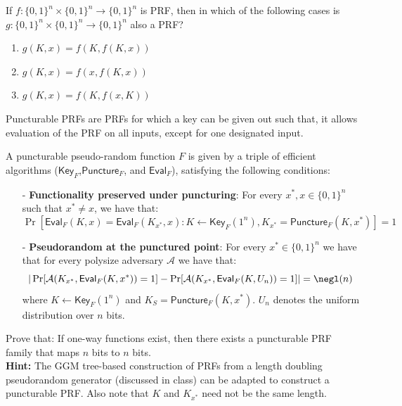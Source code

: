 \documentclass[12pt]{tufte-book}
\begin{document}
\begin{exercise}
    If $f: \{0,1\}^{n}\times \{0,1\}^n\rightarrow \{0,1\}^n$  is PRF, then in which of the following cases is $g: \{0,1\}^{n}\times \{0,1\}^n\rightarrow \{0,1\}^n$ also a PRF? \begin{enumerate} \item $g(K,x) = f(K,f(K,x))$ \item $g(K,x) = f(x,f(K,x))$ \item $g(K,x) = f(K,f(x,K))$
    \end{enumerate}
\end{exercise}

\begin{exercise} Puncturable PRFs are PRFs for which a key can be given out such that, it allows evaluation of the PRF on all inputs, except for one designated input.

    \newcommand{\A}{\mathcal{A}}
    \newcommand{\F}{F}
    \newcommand{\KeyF}{\mathsf{Key}_{\F}}
    \newcommand{\PunctureF}{\mathsf{Puncture}_{\F}}
    \newcommand{\EvalF}{\mathsf{Eval}_{\F}}


    A puncturable pseudo-random function $\F$ is given by a triple of efficient algorithms ($\KeyF$,$\PunctureF$, and $\EvalF$), satisfying the following conditions:
    \begin{itemize}
        \item[-] \textbf{Functionality preserved under puncturing}: For every $x^*, x \in \{0,1\}^{n}$ such that $x^* \neq x$, we have that:
              $$\Pr[\EvalF(K,x) = \EvalF(K_{x^*},x) : K \gets \KeyF(1^n), K_{x^*} = \PunctureF(K,x^*)] = 1$$
        \item[-] \textbf{Pseudorandom at the punctured point}: For every $x^*\in \{0,1\}^n$ we have that for every polysize adversary $\A$ we have that:
              $$|\Pr[\A(K_{x^*}, \EvalF(K,x^*)) = 1] - \Pr[\A(K_{x^*}, \EvalF(K,U_n)) = 1]|= \negl(n)$$
              where $K \gets \KeyF(1^n)$ and $K_S = \PunctureF(K,x^*)$. $U_n$ denotes the uniform distribution over $n$ bits.
    \end{itemize}

    Prove that: If one-way functions exist, then there exists a puncturable PRF family that maps $n$ bits to $n$ bits. \\
    \textbf{Hint:} The GGM tree-based construction of PRFs from a length doubling pseudorandom generator (discussed in class) can be adapted to construct a puncturable PRF. Also note that $K$ and $K_{x^*}$ need not be the same length.
\end{exercise}
\end{document}
